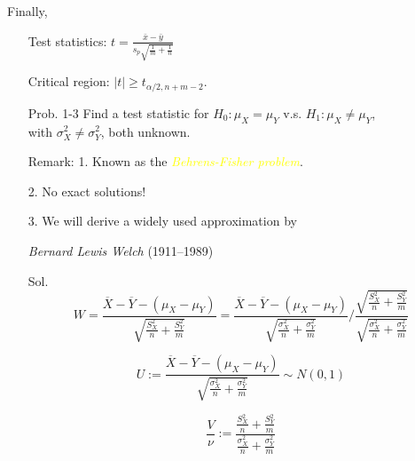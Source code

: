 \begin{frame}
	Finally, \\[2em]
\begin{enumerate}
	\item[] Test statistics: $t= \frac{\bar{x}-\bar{y}}{s_p\sqrt{\frac1m+\frac1n}}$
		\vfill
	\item[] Critical region: $|t|\ge t_{\alpha/2,n+m-2}$. \myEnd
\end{enumerate}
\end{frame}
\begin{frame}
\begin{enumerate}
	\item[Prob. 1-3] Find a test statistic for $H_0 : \mu_X = \mu_Y$ v.s. $H_1 : \mu_X \ne \mu_Y$, \\[1em]
		with $\sigma^2_X \ne \sigma^2_Y$, both unknown.\\[2em]
		\vfill
	\item[Remark:] 1. Known as the {\it \textcolor{yellow}{Behrens-Fisher problem}}.
			\vfill
		\item[] 2. No exact solutions!
			\vfill
		\item[] 3. We will derive a widely used approximation by
			\vspace{3em}
		\item[]	\hspace{5em} {\it Bernard Lewis Welch} (1911--1989)
\end{enumerate}

\end{frame}
\begin{frame}

	\begin{enumerate}
		\item[Sol.]
	\[
W =  \frac{\overline{X}-\overline{Y}-(\mu_X-\mu_Y)}{\sqrt{ \frac{S^2_X}{n}+\frac{S^2_Y}{m}  }}
=  \frac{\overline{X}-\overline{Y}-(\mu_X-\mu_Y)}{\sqrt{ \frac{\sigma^2_X}{n}+\frac{\sigma^2_Y}{m}  }}
\Bigg/  \frac{\sqrt{ \frac{S^2_X}{n}+\frac{S^2_Y}{m}  }}{\sqrt{ \frac{\sigma^2_X}{n}+\frac{\sigma^2_Y}{ m} }}
\]
\vfill \item[]
\[
U:=\frac{\overline{X}-\overline{Y}-(\mu_X-\mu_Y)}{\sqrt{ \frac{\sigma^2_X}{n}+\frac{\sigma^2_Y}{m} }}\sim N(0,1)
\]
\vfill
\item[]
\[
\frac{V}{\nu}:= \frac{\displaystyle\frac{S^2_X}{n}+\frac{S^2_Y}{m}}{\displaystyle\frac{\sigma^2_X}{n}+\frac{\sigma^2_Y}{m}}
\]
	\end{enumerate}
\end{frame}
